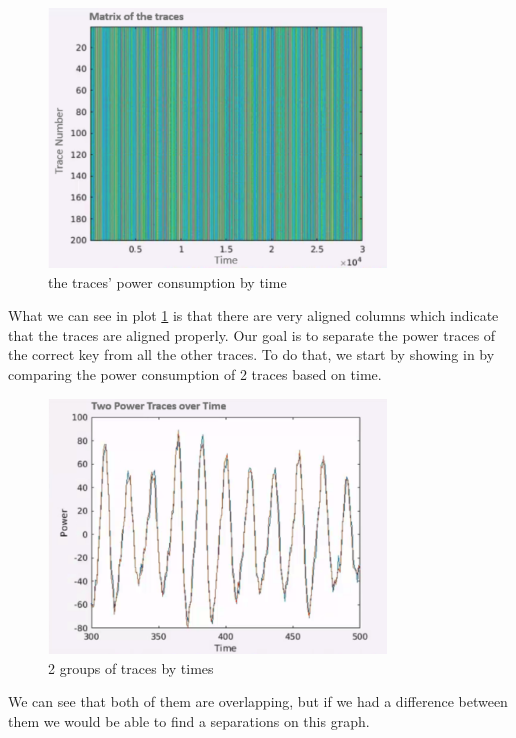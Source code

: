 \begin{figure}[!ht]
    \centering
    \includegraphics[width=0.8\textwidth]{images/Lecture6/traceByTime.png}
    \caption{the traces' power consumption by time} \label{fig:traceByTime}
\end{figure}

What we can see in plot \ref{fig:traceByTime} is that there are very aligned
columns which indicate that the traces are aligned properly. Our goal is to
separate the power traces of the correct key from all the other traces. To do
that, we start by showing in  by comparing the power
consumption of 2 traces based on time.

\begin{figure}[!ht]
    \centering
    \includegraphics[width=0.8\textwidth]{images/Lecture6/2traces-by-time.png}
    \caption{2 groups of traces by times} \label{fig:2traces-by-time}
\end{figure}

We can see that both of them are overlapping, but if we had a difference between
them we would be able to find a separations on this graph.

